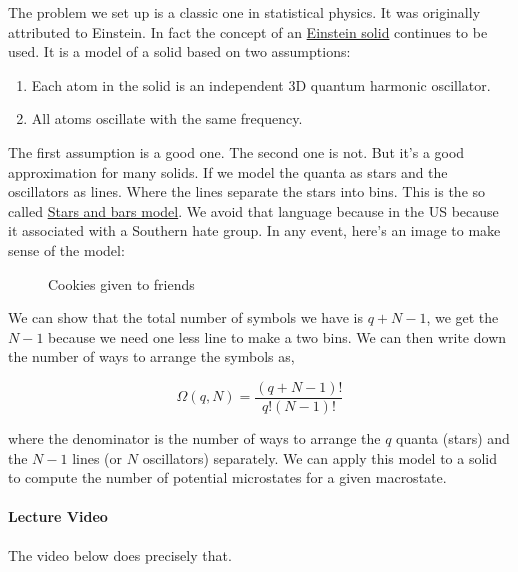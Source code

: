 The problem we set up is a classic one in statistical physics. It was
originally attributed to Einstein. In fact the concept of an
\href{https://en.wikipedia.org/wiki/Einstein_solid}{Einstein solid}
continues to be used. It is a model of a solid based on two assumptions:

\begin{enumerate}
\def\labelenumi{\arabic{enumi}.}
\tightlist
\item
  Each atom in the solid is an independent 3D quantum harmonic
  oscillator.
\item
  All atoms oscillate with the same frequency.
\end{enumerate}

The first assumption is a good one. The second one is not. But it's a
good approximation for many solids. If we model the quanta as stars and
the oscillators as lines. Where the lines separate the stars into bins.
This is the so called
\href{https://en.wikipedia.org/wiki/Stars_and_bars_(combinatorics)}{Stars
and bars model}. We avoid that language because in the US because it
associated with a Southern hate group. In any event, here's an image to
make sense of the model:

\begin{figure}
\centering
{}
\caption{Cookies given to friends}
\end{figure}

We can show that the total number of symbols we have is \(q+N-1\), we
get the \(N-1\) because we need one less line to make a two bins. We can
then write down the number of ways to arrange the symbols as,

\[\Omega(q,N) = \frac{(q+N-1)!}{q!(N-1)!}\]

where the denominator is the number of ways to arrange the \(q\) quanta
(stars) and the \(N-1\) lines (or \(N\) oscillators) separately. We can
apply this model to a solid to compute the number of potential
microstates for a given macrostate.

\paragraph{Lecture Video}\label{lecture-video-1}

The video below does precisely that.

\href{https://inv.tux.pizza/watch?v=71fk3n88t48}{\pandocbounded{\texttt{[image: https://markdown-videos-api.jorgenkh.no/youtube/71fk3n88t48?width=720\&height=405]}}}

